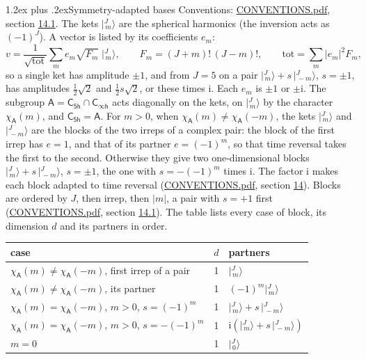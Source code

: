 \documentclass[10pt,a4paper]{article}
\makeatletter
\renewcommand\section{\@startsection{section}{1}{\z@}{-3ex plus -1ex minus -.2ex}%
  {1.2ex plus .2ex}{\normalfont\large\sffamily\bfseries\color{parttitle}}}
\numberwithin{equation}{section}
\newcommand{\grp}[1]{\mathsf{#1}}
\newcommand{\iunit}{\mathrm{i}}
\newcommand{\chiA}{\chi_{\grp{A}}}
\newcommand{\jm}[2]{\bigl\lvert{}^{#1}_{\,#2}\bigr\rangle}
\makeatother
\begin{document}
\section{Symmetry-adapted bases}\label{s:bases}
Conventions: \href{../../CONVENTIONS.pdf}{CONVENTIONS.pdf}, section \href{../../CONVENTIONS.pdf\#conv.14.1}{14.1}.
\leavevmode\label{n:index.m}\label{n:vector.ket}The kets $\jm{J}{m}$ are the spherical harmonics (the inversion acts as $(-1)^J$). \label{n:index.ketcoefficient}\label{n:vector.basis.symmetry}\label{n:index.ketweight}\label{n:index.total}A vector is listed by its coefficients $e_m$:
\begin{equation}\label{e:ket}v = \frac{1}{\sqrt{\mathrm{tot}}}\sum_m e_m\sqrt{F_m}\;\jm{J}{m},\qquad F_m = (J+m)!\,(J-m)!,\qquad \mathrm{tot} = \sum_m |e_m|^2F_m,\end{equation}
\leavevmode\label{n:index.pair.sign}so a single ket has amplitude $\pm1$, and from $J = 5$ on a pair $\jm{J}{m} + s\,\jm{J}{-m}$, $s = \pm1$, has amplitudes $\tfrac{1}{2}\sqrt{2}$ and $\tfrac{1}{2}s\sqrt{2}$, or these times $\iunit$. Each $e_m$ is $\pm1$ or $\pm\iunit$.
\leavevmode\label{n:group.A}\label{n:function.character.abelian}The subgroup $\grp{A} = \grp{C_{5h}}\cap\grp{C_{\infty h}}$ acts diagonally on the kets, on $\jm{J}{m}$ by the character $\chiA(m)$, and $\grp{C_{5h}} = \grp{A}$. For $m > 0$, when $\chiA(m) \ne \chiA(-m)$, the kets $\jm{J}{m}$ and $\jm{J}{-m}$ are the blocks of the two irreps of a complex pair: the block of the first irrep has $e = 1$, and that of its partner $e = (-1)^m$, so that time reversal takes the first to the second. Otherwise they give two one-dimensional blocks $\jm{J}{m} + s\,\jm{J}{-m}$, $s = \pm1$, the one with $s = -(-1)^m$ times $\iunit$. The factor $\iunit$ makes each block adapted to time reversal (\href{../../CONVENTIONS.pdf}{CONVENTIONS.pdf}, section \href{../../CONVENTIONS.pdf\#conv.14}{14}). Blocks are ordered by $J$, then irrep, then $|m|$, a pair with $s = +1$ first (\href{../../CONVENTIONS.pdf}{CONVENTIONS.pdf}, section \href{../../CONVENTIONS.pdf\#conv.14.1}{14.1}).
\leavevmode\label{n:head.case}\label{n:head.partners}The table lists every case of block, its dimension $d$ and its partners in order.
\begin{center}\begin{tabular}{@{}lrl@{}}\toprule
case & $d$ & partners\\\midrule
$\chiA(m) \ne \chiA(-m)$, first irrep of a pair & 1 & $\jm{J}{m}$\\
$\chiA(m) \ne \chiA(-m)$, its partner & 1 & $(-1)^m\jm{J}{m}$\\
$\chiA(m) = \chiA(-m)$, $m > 0$, $s = (-1)^m$ & 1 & $\jm{J}{m} + s\,\jm{J}{-m}$\\
$\chiA(m) = \chiA(-m)$, $m > 0$, $s = -(-1)^m$ & 1 & $\iunit(\jm{J}{m} + s\,\jm{J}{-m})$\\
$m = 0$ & 1 & $\jm{J}{0}$\\
\bottomrule\end{tabular}\end{center}
\end{document}
